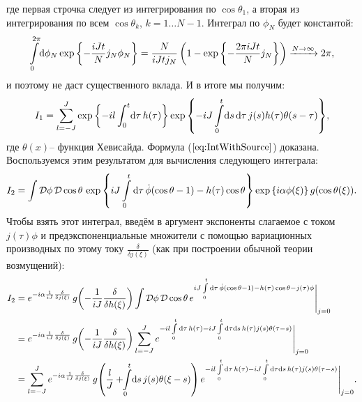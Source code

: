 где первая строчка следует из интегрирования по $\cos{\theta_1}$, а вторая из интегрирования по всем $\cos{\theta_k}$, $k=1\dots N-1$. Интеграл по $\phi_N$ будет константой:
\begin{equation*}
	\int\limits_0^{2\pi}\!\mathrm{d}\phi_N \exp{\left\{ -\frac{iJt}{N} j_N \phi_N \right\}} = \frac{N}{iJtj_N}\left( 1 - \exp{\left\{ -\frac{2\pi i J t}{N}j_N \right\}} \right) \xrightarrow{N\to \infty} 2\pi,
\end{equation*}
и поэтому не даст существенного вклада. И в итоге мы получим:
\begin{equation*}
	\label{eq:intGeneral}
	I_1  = \sum\limits_{l=-J}^J\exp{\left\{ -i l \int_0^t\!\mathrm{d}\tau\, h(\tau) \right\}} \exp{\left\{-iJ \int\limits_0^t\!\mathrm{d}s\, \mathrm{d}\tau\, j(s) h(\tau) \theta(s - \tau) \right\}},
\end{equation*}
где $\theta(x)$-- функция Хевисайда. Формула ($\ref{eq:IntWithSource}$) доказана. Воспользуемся этим результатом для вычисления следующего интеграла:
\begin{equation*}
	I_2=\int\mathcal{D}\phi\,\mathcal{D}\cos{\theta}\,\exp{\left\{ iJ\int\limits_0^t \mathrm{d}\tau\,\dot{\phi} (\cos{\theta} - 1) - h(\tau)\cos{\theta}\right\}} \exp{\left\{i \alpha \phi(\xi)\right\}} \, g(\cos{\theta(\xi)}).
\end{equation*}
Чтобы взять этот интеграл, введём в аргумент экспоненты слагаемое с током $j(\tau) \phi$ и предэкспоненциальные множители с помощью вариационных производных по этому току $\frac{\delta}{\delta j(\xi)}$ (как при построении обычной теории возмущений):
\begin{align*}
	I_2&=e^{-i\alpha\frac{1}{iJ}\frac{\delta}{\delta j(\xi)}} \, g\!\left(-\frac{1}{iJ}\frac{\delta}{\delta h(\xi)}\right)
\int\mathcal{D}\phi\,\mathcal{D}\cos{\theta}\,e^{iJ\int\limits_0^t \D \tau\,\dot{\phi} (\cos{\theta} - 1) - h(\tau)\cos{\theta} - j(\tau)\phi}\Bigg{|}_{j=0}\\
	&=e^{-i\alpha\frac{1}{iJ}\frac{\delta}{\delta j(\xi)}} \, g\!\left(-\frac{1}{iJ}\frac{\delta}{\delta h(\xi)}\right)
\sum\limits_{l=-J}^J e^{-il\int\limits_0^t\D \tau \, h(\tau) - iJ\int\limits_0^t\D \tau \D s \, h(\tau)j(s) \theta(\tau-s)}\Bigg{|}_{j=0}\\
	&=\sum\limits_{l=-J}^J e^{-i\alpha\frac{1}{iJ}\frac{\delta}{\delta j(\xi)}} \, g\!\left( \frac lJ +\mkern-\thickmuskip \int\limits_0^t \!\D s \, j(s) \theta(\xi - s) \right)e^{-il\int\limits_0^t\D \tau \, h(\tau) - iJ\int\limits_0^t\D \tau \D s \, h(\tau)j(s) \theta(\tau-s)} \Bigg{|}_{j=0}.
\end{align*}
